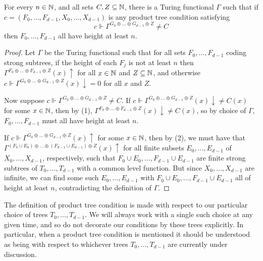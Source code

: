 \begin{lemma}\label{lem:product-tree-genericity-implies-infinity}
For every $n \in \mathbb{N}$, and all sets $C,Z \subseteq \mathbb{N}$, there is a Turing functional $\Gamma$ such that
if $c = (F_0, \dots, F_{d-1}, X_0, \dots, X_{d-1})$ is any product tree condition satisfying
$$
c \Vdash \Gamma^{G_0 \oplus \dots \oplus G_{d-1} \oplus Z} \neq C
$$
then $F_0, \dots, F_{d-1}$ all have height at least $n$.
\end{lemma}
\begin{proof}
Let $\Gamma$ be the Turing functional such that for all sets $F_0,\ldots,F_{d-1}$ coding strong subtrees, if the height of each $F_j$ is not at least $n$ then $\Gamma^{F_0 \oplus \dots \oplus F_{d-1} \oplus Z}(x) \uparrow$ for all $x \in \mathbb{N}$ and $Z \subseteq \mathbb{N}$, and otherwise $c \Vdash \Gamma^{G_0 \oplus \dots \oplus G_{d-1} \oplus Z}(x) \downarrow = 0$ for all $x$ and $Z$.

Now suppose $c \Vdash \Gamma^{G_0 \oplus \dots \oplus G_{d-1} \oplus Z} \neq C$. If $c \Vdash \Gamma^{G_0 \oplus \dots \oplus G_{d-1} \oplus Z}(x)\downarrow \neq C(x)$ for some $x \in \mathbb{N}$, then by (1), $\Gamma^{F_0 \oplus \dots \oplus F_{d-1} \oplus Z}(x)\downarrow \neq C(x)$, so by choice of $\Gamma$, $F_0, \dots, F_{d-1}$ must all have height at least $n$.

If $c \Vdash \Gamma^{G_0 \oplus \dots \oplus G_{d-1} \oplus Z}(x)\uparrow$ for some $x \in \mathbb{N}$, then by (2), we must have that $\Gamma^{(F_0 \cup E_0) \oplus \dots \oplus (F_{d-1} \cup E_{d-1}) \oplus Z}(x)\uparrow$ for all finite subsets $E_0,\ldots,E_{d-1}$ of $X_0,\ldots,X_{d-1}$, respectively, such that $F_0 \cup E_0, \dots, F_{d-1} \cup E_{d-1}$ are finite strong subtrees of $T_0, \dots, T_{d-1}$ with a common level function. But since $X_0, \dots, X_{d-1}$ are infinite, we can find some such $E_0, \dots, E_{d-1}$ with $F_0 \cup E_0, \dots, F_{d-1} \cup E_{d-1}$ all of height at least $n$, contradicting the definition of $\Gamma$.
\end{proof}

\begin{remark}
	The definition of product tree condition is made with respect to our particular choice of trees $T_0,\ldots,T_{d-1}$. We will always work with a single such choice at any given time, and so do not decorate our conditions by these trees explicitly. In particular, when a product tree condition is mentioned it should be understood as being with respect to whichever trees $T_0,\ldots,T_{d-1}$ are currently under discussion.
\end{remark}


